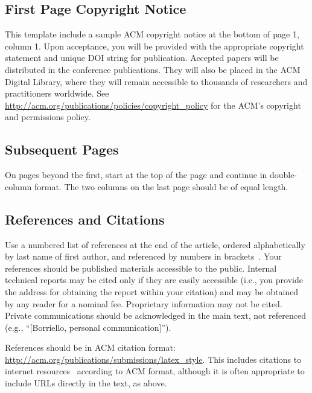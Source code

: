 \documentclass{sigchi}
\begin{document}
\subsection{First Page Copyright Notice}
This template include a sample ACM copyright notice at the bottom of
page 1, column 1.  Upon acceptance, you will be provided with the
appropriate copyright statement and unique DOI string for publication.
Accepted papers will be distributed in the conference
publications. They will also be placed in the ACM Digital Library,
where they will remain accessible to thousands of researchers and
practitioners worldwide. See
\url{http://acm.org/publications/policies/copyright_policy} for the
ACM's copyright and permissions policy.

\subsection{Subsequent Pages}

On pages beyond the first, start at the top of the page and continue
in double-column format.  The two columns on the last page should be
of equal length.



\subsection{References and Citations}

Use a numbered list of references at the end of the article, ordered
alphabetically by last name of first author, and referenced by numbers
in
brackets~\cite{Han:2005}.
Your references should be published materials accessible to the
public. Internal technical reports may be cited only if they are
easily accessible (i.e., you provide the address for obtaining the
report within your citation) and may be obtained by any reader for a
nominal fee. Proprietary information may not be cited. Private
communications should be acknowledged in the main text, not referenced
(e.g., ``[Borriello, personal communication]'').

References should be in ACM citation format:
\url{http://acm.org/publications/submissions/latex_style}. This
includes citations to internet
resources~\cite{Han:2005}
according to ACM format, although it is often appropriate to include
URLs directly in the text, as above.


\end{document}
